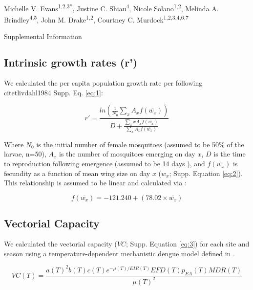 \documentclass[12pt]{article}
\begin{document}
{\Large
\textbf{}}

\bigskip

Michelle V. Evans\textsuperscript{1,2,3*},
Justine C. Shiau\textsuperscript{4},
Nicole Solano\textsuperscript{1,2},
Melinda A. Brindley\textsuperscript{4,5},
John M. Drake\textsuperscript{1,2},
Courtney C. Murdock\textsuperscript{1,2,3,4,6,7}
\smallskip

{\Large{Supplemental Information}}

\subsection{Intrinsic growth rates (r')}

We calculated the per capita population growth rate per following citet{livdahl1984} {Supp. Eq. \ref{eq:1}}:

\begin{equation} \label{eq:1}
r' = \frac{ln(\frac{1}{N_0}\sum_{x}^{ }{A_x}f(\bar{w_x}))}{D+\frac{\sum_{x}^{ }xA_xf(\bar{w_x})}{\sum_{x}^{ }A_xf(\bar{w_x})}}
\end{equation}

Where $N_0$ is the initial number of female mosquitoes (assumed to be 50\% of the larvae, n=50), $A_x$ is the number of mosquitoes emerging on day $x$, $D$ is the time to reproduction following emergence (assumed to be 14 days \citep{livdahl1991}), and $f(\bar{w_x})$ is fecundity as a function of mean wing size on day $x$ ($w_x$; Supp. Equation \ref{eq:2}). This relationship is assumed to be linear and calculated via \citep{lounibos2002}:

\begin{equation} \label{eq:2}
f(\bar{w_x}) = -121.240 + (78.02 \times \bar{w_x})
\end{equation}

\subsection{Vectorial Capacity}

We calculated the vectorial capacity ($VC$; Supp. Equation \ref{eq:3}) for each site and season using a temperature-dependent mechanistic dengue model defined in \citet{mordecai2017}.

\begin{equation} \label{eq:3}
VC(T) =\frac{a(T)^2b(T)c(T)e^{-\mu (T)/EIR(T)} EFD(T) p_{EA}(T) MDR(T)} {\mu(T)^2}
\end{equation}
\end{document}
